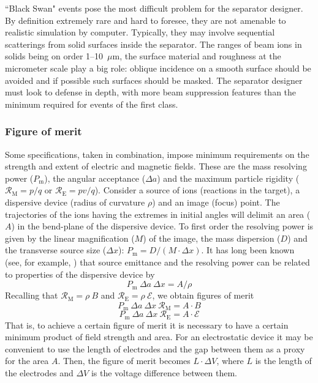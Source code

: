   ``Black Swan" events pose the most difficult problem for the separator designer.   By definition extremely rare and hard to foresee,  they are not  amenable to realistic simulation by computer.   Typically, they may involve sequential scatterings from  solid surfaces inside the separator.   The ranges of beam ions in solids being on order 1--10~$\mu$m, the surface material and roughness at the micrometer scale play a big role: oblique incidence on a smooth surface should be avoided and if possible such surfaces should be masked.   The separator designer must look to defense in depth, with more beam suppression features than the minimum required for events of the first  class.

  \subsubsection{Figure of merit}
  Some specifications, taken in combination, impose minimum requirements on the strength and extent of electric and magnetic fields.   These are the mass resolving power ($P_\mathrm{m}$), the angular acceptance ($\Delta a$) and the maximum particle rigidity 
  ($\mathcal{R}_\mathrm{M}=p/q$ or $\mathcal{R}_\mathrm{E}=pv/q$).    
  Consider a source of ions (reactions in the target), a dispersive device  (radius of curvature $\rho$) and an image (focus) point.   The  trajectories of the ions having the extremes in initial angles will delimit an area ($A$)  in the bend-plane of the dispersive device.     To first order the resolving power is given by the linear magnification ($M$) of the image, the mass dispersion ($D$) and the transverse source size ($\Delta x$): 
  $P_\mathrm{m} = D/(M \cdot \Delta x) $. 
  It has long been known (see, for example, \cite{Wo71}) that source emittance and the resolving power can be related to properties of the dispersive device by
  \[ P_\mathrm{m}\  \Delta a\  \Delta x = A/\rho \]
  Recalling that 
  $\mathcal{R}_\mathrm{M}=\rho \ B$ and $\mathcal{R}_\mathrm{E}=\rho \ \mathcal{E}$,  we obtain  figures of merit 
  \[ P_\mathrm{m}\  \Delta a\  \Delta x \ \mathcal{R}_\mathrm{M} = A \cdot B \]
   \[P_\mathrm{m}\  \Delta a\  \Delta x \ \mathcal{R}_\mathrm{E} = A \cdot \mathcal{E} \]
   That is, to achieve a certain figure of merit it is necessary to have a certain minimum product of field strength and area.  For an electrostatic device it may be convenient to use the length of electrodes and the gap between them as a proxy for the area $A$.  Then, the figure of merit becomes $L\cdot\Delta V$, where $L$ is the length of the electrodes and $\Delta V$ is the voltage difference between them.

